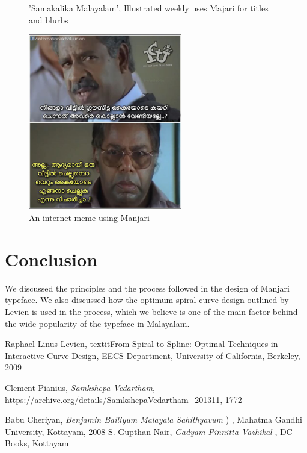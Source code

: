 \documentclass[11pt,twoside,a4paper,parskip=half]{scrartcl}
\begin{document}
\begin{figure}[h!]
\begin{subfigure}[b]{.45\textwidth}
	\end{subfigure}

	\caption{'Samakalika Malayalam', Illustrated weekly uses Majari for titles and blurbs}
	\label{manjari-sample-3}
\end{figure}

\begin{figure}[h!]
	\includegraphics[width=0.6\textwidth]{images/manjari-sample-4.png}
	\caption{An internet meme using Manjari}
	\label{manjari-sample-4}
\end{figure}

\clearpage
\section{Conclusion}

We discussed the principles and the process followed in the design of Manjari typeface. We also discussed how the optimum spiral curve design outlined by Levien is used in the process, which we believe is one of the main factor behind the wide popularity of the typeface in Malayalam.


\begin{thebibliography}{11}

  Raphael Linus Levien,
  textit{From Spiral to Spline: Optimal Techniques in Interactive Curve Design},
  EECS Department, University of California, Berkeley,
  2009

 Clement Pianius,
 \emph{Samkshepa Vedartham},
 \url{https://archive.org/details/SamkshepaVedartham_201311},
 1772

 Babu Cheriyan, \textit{Benjamin Bailiyum Malayala Sahithyavum} {) }, Mahatma Gandhi University, Kottayam, 2008
	 S. Gupthan Nair, \textit{Gadyam Pinnitta Vazhikal}{ }, DC Books, Kottayam 

	
\end{thebibliography}
\end{document}
